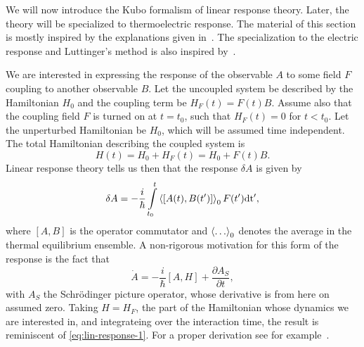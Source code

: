 We will now introduce the Kubo formalism of linear response theory.
Later, the theory will be specialized to thermoelectric response.
The material of this section is mostly inspired by the explanations given in~\textcite{giulianiQuantumTheoryElectron2005}.
The specialization to the electric response and Luttinger's method is also inspired by~\textcite{mahanManyparticlePhysics2000}.

We are interested in expressing the response of the observable ${A}$ to some field $F$ coupling to another observable ${B}$.
Let the uncoupled system be described by the Hamiltonian $H_{0}$ and the coupling term be $H_F(t) = F(t) {B}$.
Assume also that the coupling field $F$ is turned on at $t=t_0$,  such that $H_F(t) = 0$ for $t < t_0$.
Let the unperturbed Hamiltonian be $H_0$, which will be assumed time independent.
The total Hamiltonian describing the coupled system is
\begin{equation}
  \label{eq:kubo-perturbation}
{H}(t) = H_0 + H_F(t) = H_0+ F(t) {B}.
\end{equation}
Linear response theory tells us then that the response $\delta {A}$ is given by~\cite{giulianiQuantumTheoryElectron2005}
\begin{equation}\label{eq:lin-response-1}
  \delta {A} = -\frac{i}{\hbar} \int\limits_{t_0}^t
  \Braket{\left[
{A}(t), {B}(t')
\right]}_{0}
F(t') \mathrm{dt'},
\end{equation}
where $[{A}, {B}]$ is the operator commutator and $\braket{\dots}_0$ denotes the average in the thermal equilibrium ensemble.
A  non-rigorous motivation for this form of the response is the fact that
\begin{equation}
  \dot{{A}} = -\frac{i}{\hbar } \left[ {A}, H \right]
  + \frac{\partial {A}_{S}}{\partial t}, 
\end{equation}
with $A_S$ the Schrödinger picture operator, whose derivative is from here on assumed zero.
Taking $H=H_F$, the part of the Hamiltonian whose dynamics we are interested in, and integrateing over the interaction time, the result is reminiscent of \cref{eq:lin-response-1}.
For a proper derivation see for example~\textcite[Chapter 3.3]{giulianiQuantumTheoryElectron2005}.

